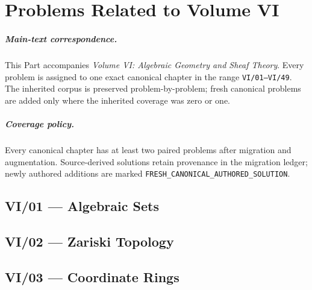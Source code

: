 ﻿\chapter{Problems Related to Volume VI}
\label{ch:companion-vi}



\paragraph{Main-text correspondence.}
This Part accompanies \emph{Volume VI: Algebraic Geometry and Sheaf Theory}. Every problem is assigned to one exact canonical chapter in the range \texttt{VI/01--VI/49}. The inherited corpus is preserved problem-by-problem; fresh canonical problems are added only where the inherited coverage was zero or one.

\paragraph{Coverage policy.}
Every canonical chapter has at least two paired problems after migration and augmentation. Source-derived solutions retain provenance in the migration ledger; newly authored additions are marked \texttt{FRESH\_CANONICAL\_AUTHORED\_SOLUTION}.

\section{VI/01 --- Algebraic Sets}




\section{VI/02 --- Zariski Topology}




\section{VI/03 --- Coordinate Rings}




